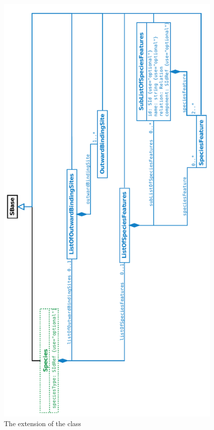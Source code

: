 \begin{figure}[htb]
  \begin{center}
    \includegraphics[angle=-90, scale=0.78]{./figs/multi_007_Species.pdf}
    \caption{The extension of the \ExSpecies class}
  \label{fig:ExSpecies}
  \end{center}
\end{figure}

